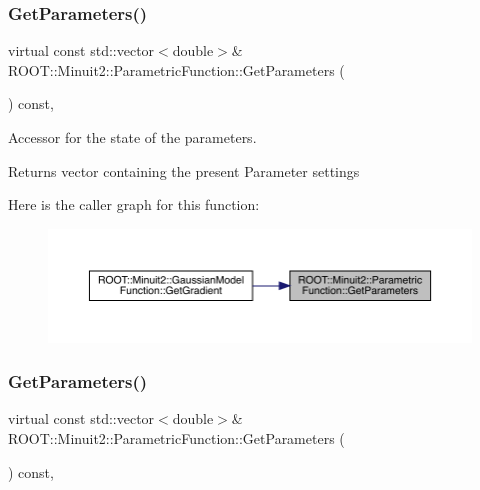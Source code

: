 \subsubsection{\texorpdfstring{GetParameters()}{GetParameters()}\hspace{0.1cm}{\footnotesize\ttfamily [2/3]}}
{\footnotesize\ttfamily virtual const std\+::vector$<$double$>$\& R\+O\+O\+T\+::\+Minuit2\+::\+Parametric\+Function\+::\+Get\+Parameters (\begin{DoxyParamCaption}{ }\end{DoxyParamCaption}) const\hspace{0.3cm}{\ttfamily [inline]}, {\ttfamily [virtual]}}

Accessor for the state of the parameters.

\begin{DoxyReturn}{Returns}
vector containing the present Parameter settings 
\end{DoxyReturn}
Here is the caller graph for this function\+:
\nopagebreak
\begin{figure}[H]
\begin{center}
\leavevmode
\includegraphics[width=350pt]{d3/d76/classROOT_1_1Minuit2_1_1ParametricFunction_ac3e70b4d9b0cbe60c529823f6a612a5e_icgraph}
\end{center}
\end{figure}
\mbox{\label{classROOT_1_1Minuit2_1_1ParametricFunction_ac3e70b4d9b0cbe60c529823f6a612a5e}} 
\subsubsection{\texorpdfstring{GetParameters()}{GetParameters()}\hspace{0.1cm}{\footnotesize\ttfamily [3/3]}}
{\footnotesize\ttfamily virtual const std\+::vector$<$double$>$\& R\+O\+O\+T\+::\+Minuit2\+::\+Parametric\+Function\+::\+Get\+Parameters (\begin{DoxyParamCaption}{ }\end{DoxyParamCaption}) const\hspace{0.3cm}{\ttfamily [inline]}, {\ttfamily [virtual]}}

